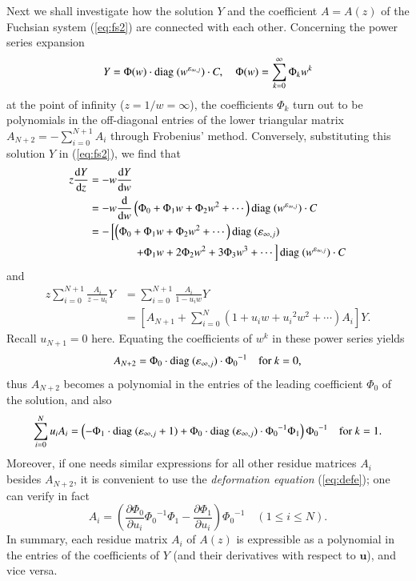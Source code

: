 \documentclass[12pt]{article}
\numberwithin{equation}{section}
\begin{document}
Next we shall investigate how 
the solution $Y$ and the coefficient $A=A(z)$ of the Fuchsian system (\ref{eq:fs2})
are connected with each other.
Concerning the power series expansion
\[
Y=
\Phi (w) \cdot {\rm diag \ }  (w^{\varepsilon_{\infty,j}}) \cdot C,
\quad \Phi(w)= \sum_{k=0}^\infty \Phi_k w^k
 \]
 at the point of infinity ($z=1/w=\infty$),
 the coefficients $\Phi_k$ turn out to be
 polynomials in the off-diagonal entries of 
 the lower triangular matrix 
 $A_{N+2}=-\sum_{i=0}^{N+1}A_i$
through Frobenius' method.
Conversely, substituting this solution $Y$ in (\ref{eq:fs2}),
we find that 
\begin{align*}
z \frac{{\rm d}Y}{{\rm d} z}
&=-w \frac{{\rm d}Y}{{\rm d} w}
\\
&=-w \frac{{\rm d}}{{\rm d} w} 
\left(\Phi_0+\Phi_1 w+\Phi_2 w^2 +\cdots
\right)
{\rm diag \ }
(w^{\varepsilon_{\infty,j}})
\cdot C
\\
&=
-
\left[
\left(\Phi_0+\Phi_1 w+\Phi_2 w^2 +\cdots \right)
{\rm diag \ }
(\varepsilon_{\infty,j})
\right.
\\
&\qquad \qquad
\left.
+ \Phi_1 w +2 \Phi_2 w^2 +3 \Phi_3 w^3 +\cdots  \right]
{\rm diag \ }
(w^{\varepsilon_{\infty,j}})
\cdot C
\end{align*}
and
\begin{align*}
z \sum_{i=0}^{N+1}
\frac{A_i}{z-u_i} Y 
&=\sum_{i=0}^{N+1}
\frac{A_i}{1-u_iw} Y 
\\
&=\left[
A_{N+1}+
\sum_{i=0}^{N} \left(1+ u_iw 
+{u_i}^2 w^2  + \cdots\right)A_i
\right]Y.
\end{align*}
Recall  $u_{N+1}=0$ here.
Equating the coefficients of $w^k$ in these power series yields
\[
A_{N+2}
=\Phi_0  \cdot 
 {\rm diag \ }  (\varepsilon_{\infty,j})
 \cdot {\Phi_0}^{-1}
 \quad \text{for $k=0$,}
\]
thus $A_{N+2}$ becomes a polynomial in the entries of the leading coefficient $\Phi_0$ of the solution,
and also
\[
\sum_{i=0}^{N} u_i A_i
=\left(
-\Phi_1  \cdot {\rm diag \ } (\varepsilon_{\infty,j}+1) +
\Phi_0 \cdot {\rm diag \ }(\varepsilon_{\infty,j}) \cdot {\Phi_0}^{-1} \Phi_1 
\right){\Phi_0}^{-1}
\quad \text{for $k=1$.}
\]
Moreover, if one needs  
similar expressions for all other residue matrices $A_i$
besides $A_{N+2}$,
it is convenient to use the {\it deformation equation}
(\ref{eq:defe});
one can verify in fact
\[
A_i 
=\left(
\frac{\partial \Phi_0}{\partial u_i}
{\Phi_0}^{-1}\Phi_1-
\frac{\partial \Phi_1}{\partial u_i}
\right)
{\Phi_0}^{-1}\quad (1 \leq i \leq  N).
\]
In summary, 
each residue matrix $A_i$ of $A(z)$ is expressible as a polynomial in
the entries of the coefficients of $Y$ (and their derivatives with respect to ${\boldsymbol u}$),
and vice versa.
\end{document}
